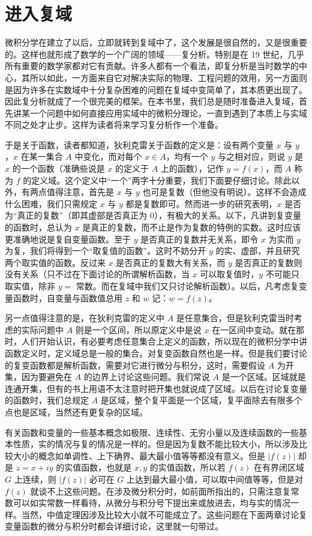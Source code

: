 \section{进入复域}

微积分学在建立了以后，立即就转到复域中了，这个发展是很自然的，又是很重要的。这样也就形成了数学的一个广阔的领域——复分析。特别是在 19 世纪，几乎所有重要的数学家都对它有贡献。许多人都有一个看法，即复分析是当时数学的中心，其所以如此，一方面来自它对解决实际的物理、工程问题的效用，另一方面则是因为许多在实数域中十分复杂困难的问题在复域中变简单了，其本质更出现了。因此复分析就成了一个很完美的框架。在本书里，我们总是随时准备进入复域，首先讲某一个问题中如何直接应用实域中的微积分理论，一直到遇到了本质上与实域不同之处才止步。这样为读者将来学习复分析作一个准备。

于是关于函数，读者都知道，狄利克雷关于函数的定义是：设有两个变量 $x$ 与 $y$，$x$ 在某一集合 $A$ 中变化，而对每个 $x\in A$，均有一个 $y$ 与之相对应，则说 $y$ 是 $x$ 的一个函数（准确些说是 $x$ 的定义于 $A$ 上的函数），记作 $y=f(x)$，而 $A$ 称为 $f$ 的定义域。这个定义中“一个”两字十分重要，我们下面要仔细讨论。除此以外，有两点值得注意，首先是 $x$ 与 $y$ 也可是复数（但他没有明说）。这样不会造成什么困难，我们只需规定 $x$ 与 $y$ 都是复数即可。然而进一步的研究表明，$x$ 是否为“真正的复数”（即其虚部是否真正为 0），有极大的关系。以下，凡讲到复变量的函数时，总认为 $x$ 是真正的复数，而不止是作为复数的特例的实数。这时应该更准确地说是复自变量函数。至于 $y$ 是否真正的复数并无关系，即令 $x$ 为实而 $y$ 为复，我们将得到一个“取复值的函数”。这时不妨分开 $y$ 的实、虚部，并且研究两个取实值的函数。反过来 $x$ 是否真正的复数大有关系，而 $y$ 是否真正的复数则没有关系（只不过在下面讨论的所谓解析函数，当 $x$ 可以取复值时，$y$ 不可能只取实值，除非 $y=$ 常数。而在复域中我们又只讨论解析函数）。以后，凡考虑复变量函数时，自变量与函数值总用 $z$ 和 $w$ 记：$w=f(z)$。

另一点值得注意的是，在狄利克雷的定义中 $A$ 是任意集合，但是狄利克雷当时考虑的实际问题中 $A$ 则是一个区间，所以原定义中是说 $x$ 在一区间中变动。就在那时，人们开始认识，有必要考虑任意集合上定义的函数，所以现在的微积分学中讲函数定义时，定义域总是一般的集合。对复变函数自然也是一样。但是我们要讨论的复变函数都是解析函数，需要对它进行微分与积分，这时，需要假设 $A$ 为开集，因为要避免在 $A$ 的边界上讨论这些问题。我们常说 $A$ 是一个区域。区域就是连通开集，但有的书上用语不太注意时把开集也就说成了区域。以后在讨论复变量的函数时，我们总规定 $A$ 是区域，整个复平面是一个区域，复平面除去有限多个点也是区域，当然还有更复杂的区域。

有关函数和变量的一些基本概念如极限、连续性、无穷小量以及连续函数的一些基本性质，实的情况与复的情况是一样的。但是因为复数不能比较大小，所以涉及比较大小的概念如单调性、上下确界、最大最小值等等都没有意义。但是 $|f(z)|$ 却是 $z=x+iy$ 的实值函数，也就是 $x,y$ 的实值函数，所以若 $f(z)$ 在有界闭区域 $G$ 上连续，则 $|f(z)|$ 必可在 $G$ 上达到最大最小值，可以取中间值等等，但是对 $f(z)$ 就谈不上这些问题。在涉及微分积分时，如前面所指出的，只需注意复常数可以如实常数一样看待，从微分与积分号下提出来或放进去，均与实的情况一样。当然，中值定理因涉及比较大小就不可能成立了。这些问题在下面两章讨论复变量函数的微分与积分时都会详细讨论，这里就一句带过。

